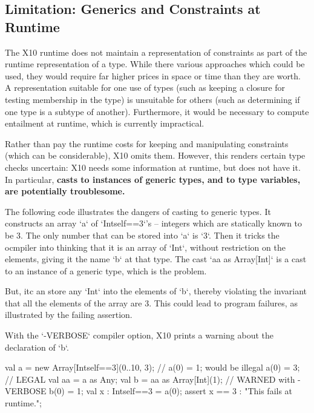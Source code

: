 \subsection{Limitation: Generics and Constraints at Runtime}
\label{sect:RuntimeConstraintErasure}


The X10 runtime does not maintain a representation of constraints as part of
the runtime representation of a type.  While there various approaches which
could be used,  they would require far higher prices in space or time than
they are worth.  A representation suitable for one use of types
(such as keeping a closure for testing membership in the type) is unsuitable
for others (such as determining if one type is a subtype of another).
Furthermore, it would be necessary to compute entailment at runtime, which is
currently impractical.  














Rather than pay the runtime costs for keeping and manipulating constraints
(which can be considerable), X10 omits them.
However, this renders certain type checks uncertain: X10 needs some
information at runtime, but does not have it.    In particular, {\bf casts to
instances of generic types, and to type variables, are potentially troublesome.}


\begin{ex}
The following code illustrates the dangers of casting to generic types. 
It constructs an array \xcd`a` of \xcd`Int{self==3}`'s -- integers
which 
are statically known to be 3. 
The only number that can be stored into \xcd`a` is \xcd`3`.  
Then it tricks the ocmpiler into 
thinking that it is an array of \xcd`Int`, without restriction on the
elements, giving it the name \xcd`b` at that type.  
The cast \xcd`aa as Array[Int]` is a cast to an instance of a generic type,
which is the problem. 

But, itc an store any \xcd`Int` into the elements of 
\xcd`b`, thereby violating 
the invariant that all the elements of the array are 3.  
This could lead to program failures, as illustrated by the failing assertion.  

With the \xcd`-VERBOSE` compiler option, X10 prints a warning about the
declaration of \xcd`b`.  
\begin{xten}
  val a = new Array[Int{self==3}](0..10, 3);
  // a(0) = 1; would be illegal
  a(0) = 3; // LEGAL
  val aa = a as Any;
  val b = aa as Array[Int](1); // WARNED with -VERBOSE
  b(0) = 1;
  val x : Int{self==3} = a(0);
  assert x == 3 : "This fails at runtime.";
\end{xten}
\end{ex}


